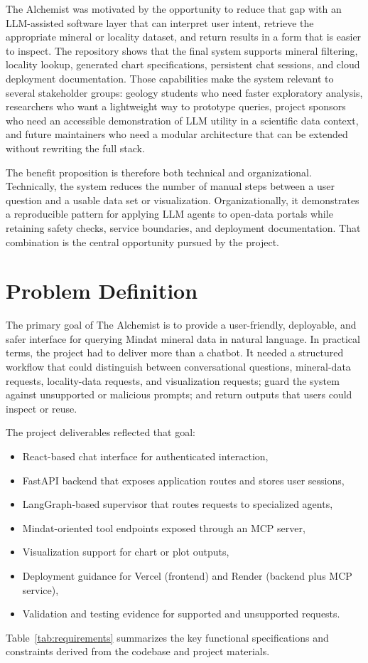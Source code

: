 \documentclass[12pt,oneside]{report}
\begin{document}
The Alchemist was motivated by the opportunity to reduce that gap with an LLM-assisted software layer that can interpret user intent, retrieve the appropriate mineral or locality dataset, and return results in a form that is easier to inspect. The repository shows that the final system supports mineral filtering, locality lookup, generated chart specifications, persistent chat sessions, and cloud deployment documentation. Those capabilities make the system relevant to several stakeholder groups: geology students who need faster exploratory analysis, researchers who want a lightweight way to prototype queries, project sponsors who need an accessible demonstration of LLM utility in a scientific data context, and future maintainers who need a modular architecture that can be extended without rewriting the full stack.

The benefit proposition is therefore both technical and organizational. Technically, the system reduces the number of manual steps between a user question and a usable data set or visualization. Organizationally, it demonstrates a reproducible pattern for applying LLM agents to open-data portals while retaining safety checks, service boundaries, and deployment documentation. That combination is the central opportunity pursued by the project.
\clearpage




\section{Problem Definition}

The primary goal of The Alchemist is to provide a user-friendly, deployable, and safer interface for querying Mindat mineral data in natural language. In practical terms, the project had to deliver more than a chatbot. It needed a structured workflow that could distinguish between conversational questions, mineral-data requests, locality-data requests, and visualization requests; guard the system against unsupported or malicious prompts; and return outputs that users could inspect or reuse.

The project deliverables reflected that goal:

\begin{itemize}
    \item React-based chat interface for authenticated interaction,
    \item FastAPI backend that exposes application routes and stores user sessions,
    \item LangGraph-based supervisor that routes requests to specialized agents,
    \item Mindat-oriented tool endpoints exposed through an MCP server,
    \item Visualization support for chart or plot outputs,
    \item Deployment guidance for Vercel (frontend) and Render (backend plus MCP service),
    \item Validation and testing evidence for supported and unsupported requests.
\end{itemize}
Table~\ref{tab:requirements} summarizes the key functional specifications and constraints derived from the codebase and project materials.
\end{document}
